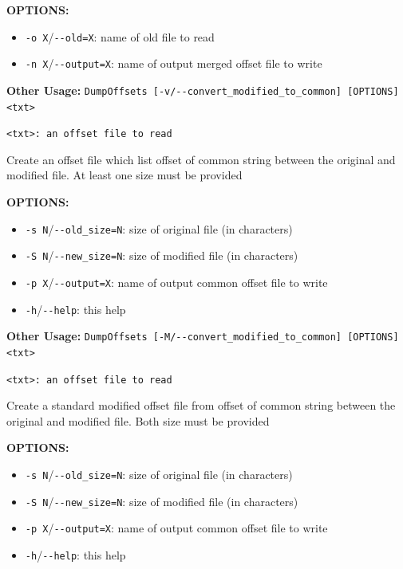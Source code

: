 \bigskip
\noindent \textbf{OPTIONS:}

\begin{itemize} 	 
  \item \verb+-o X+/\verb+--old=X+: name of old file to read 	 
  \item \verb+-n X+/\verb+--output=X+: name of output merged offset file to write
\end{itemize}

\bigskip
\noindent \textbf{Other Usage:} \verb+DumpOffsets [-v/--convert_modified_to_common] [OPTIONS] <txt>+

\bigskip
\noindent \verb+<txt>: an offset file to read+

\bigskip
\noindent Create an offset file which list offset of common string between the original and modified file. At least one size must be provided 	 

\bigskip
\noindent \textbf{OPTIONS:}
	  	 
\begin{itemize} 	 
  \item \verb+-s N+/\verb+--old_size=N+: size of original file (in characters) 	 
  \item \verb+-S N+/\verb+--new_size=N+: size of modified file (in characters) 	 
  \item \verb+-p X+/\verb+--output=X+: name of output common offset file to write 	 
  \item \verb+-h+/\verb+--help+: this help 	 
\end{itemize} 	 

\bigskip
\noindent \textbf{Other Usage:} \verb+DumpOffsets [-M/--convert_modified_to_common] [OPTIONS] <txt>+

\bigskip
\noindent \verb+<txt>: an offset file to read+

\bigskip
\noindent Create a standard modified offset file from offset of common string between the original and modified file. Both size must be provided 	 
	
\bigskip
\noindent \textbf{OPTIONS:}
	  	 
\begin{itemize} 	 
  \item \verb+-s N+/\verb+--old_size=N+: size of original file (in characters) 	 
  \item \verb+-S N+/\verb+--new_size=N+: size of modified file (in characters) 	 
  \item \verb+-p X+/\verb+--output=X+: name of output common offset file to write 	 
  \item \verb+-h+/\verb+--help+: this help 	 
\end{itemize} 	 

